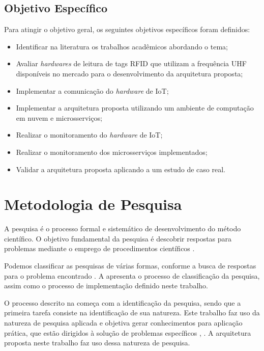 \subsection{Objetivo Específico}

Para atingir o objetivo geral, os seguintes objetivos específicos foram definidos:

\begin{itemize}
    \item Identificar na literatura os trabalhos acadêmicos abordando o tema;
    \item Avaliar \textit{hardwares} de leitura de tags \acrshort{RFID} que utilizam a frequência \acrshort{UHF} disponíveis no mercado para o desenvolvimento da arquitetura proposta;
    \item Implementar a comunicação do \textit{hardware} de \acrshort{IoT};
    \item Implementar a arquitetura proposta utilizando um ambiente de computação em nuvem e microsserviços;
    \item Realizar o monitoramento do \textit{hardware} de \acrshort{IoT};
    \item Realizar o monitoramento dos microsserviços implementados;
    \item Validar a arquitetura proposta aplicando a um estudo de caso real.
\end{itemize}

\section{Metodologia de Pesquisa}

A pesquisa é o processo formal e sistemático de desenvolvimento do método científico. O objetivo fundamental da pesquisa é descobrir respostas para problemas mediante o emprego de procedimentos científicos \cite{Gil2008MetodosSocial}. 

Podemos classificar as pesquisas de várias formas, conforme a busca de respostas para o problema encontrado \cite{Marconi2003FundamentosCientifica}. A  apresenta o processo de classificação da pesquisa, assim como o processo de implementação definido neste trabalho.


O processo descrito na  começa com a identificação da pesquisa, sendo que a primeira tarefa consiste na identificação de sua natureza. Este trabalho faz uso da natureza de pesquisa aplicada e objetiva gerar conhecimentos para aplicação prática, que estão dirigidos à solução de problemas específicos \cite{Gil2008MetodosSocial}, \cite{Marconi2003FundamentosCientifica}. A arquitetura proposta neste trabalho faz uso dessa natureza de pesquisa.

